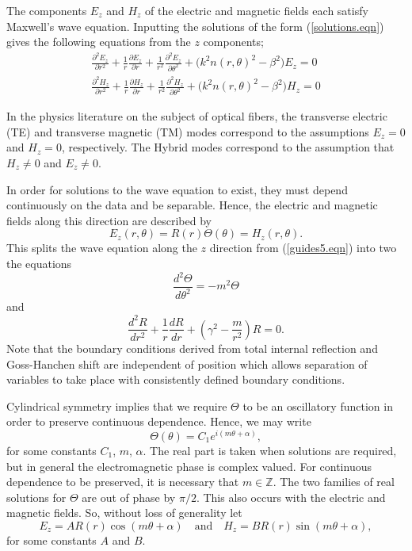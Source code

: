 \documentclass[12pt]{article}
\theoremstyle{definition}
\numberwithin{equation}{section}
\begin{document}
{The components $E_z$ and $H_z$ of the electric and magnetic fields each satisfy Maxwell's wave equation. Inputting the solutions of the form (\ref{solutions.eqn}) gives the following equations from the $z$ components;
\begin{gather} 
\frac{\partial^{2}E_{z}}{\partial r^2}+\frac{1}{r}\frac{\partial E_z}{\partial r}+\frac{1}{r^{2}}\frac{\partial^{2}E_z}{\partial\theta^2}+\big( k^{2}n(r,\theta)^{2}-\beta^{2}\big) E_z =0\\
\frac{\partial^{2}H_{z}}{\partial r^2}+\frac{1}{r}\frac{\partial H_z}{\partial r}+\frac{1}{r^{2}}\frac{\partial^{2}H_z}{\partial\theta^2}+\big( k^{2}n(r,\theta)^{2}-\beta^{2}\big) H_z =0
\label{guides5.eqn}
\end{gather}

In the physics literature on the subject of optical fibers, the transverse electric (TE) and transverse magnetic (TM) modes correspond to the assumptions $E_z=0$ and $H_z=0$, respectively. The Hybrid modes correspond to the assumption that $H_z\neq 0$ and $E_z\neq 0$. 

In order for solutions to the wave equation to exist, they must depend continuously on the data and be separable. Hence, the electric and magnetic fields along this direction are described by
$$E_z(r,\theta)=R(r)\Theta(\theta)=H_z(r,\theta).$$
This splits the wave equation along the $z$ direction from (\ref{guides5.eqn}) into two the equations 
\begin{equation}
\frac{d^2\Theta}{d\theta^2}=-m^2\Theta
\end{equation}
and
\begin{equation}
\frac{d^2 R}{dr^2}+\frac{1}{r}\frac{dR}{dr}+\left(\gamma^2-\frac{m}{r^2}\right)R=0.\label{radialbessel.eqn}
\end{equation}
Note that the boundary conditions derived from total internal reflection and Goss-Hanchen shift are independent of position which allows separation of variables to take place with consistently defined boundary conditions.

Cylindrical symmetry implies that we require $\Theta$ to be an oscillatory function in order to preserve continuous dependence. Hence, we may write
$$\Theta(\theta)=C_1e^{i(m\theta+\alpha)},$$
for some constants $C_1$, $m$, $\alpha$. The real part is taken when solutions are required, but in general the electromagnetic phase is complex valued. For continuous dependence to be preserved, it is necessary that $m\in\mathbb{Z}$. The two families of real solutions for $\Theta$ are out of phase by $\pi\slash 2$. This also occurs with the electric and magnetic fields. So, without loss of generality let
$$E_z=AR(r)\cos{(m\theta+\alpha)}\quad\mbox{and}\quad H_z=BR(r)\sin{(m\theta+\alpha)},$$
for some constants $A$ and $B$.

}
\end{document}
